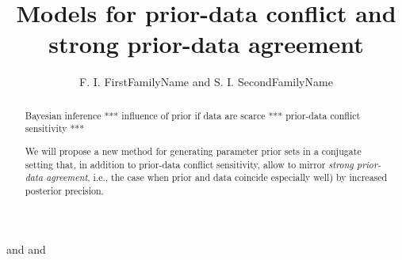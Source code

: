 %
\renewcommand{\thefootnote}{\fnsymbol{footnote}}
\author{F. I. FirstFamilyName and S. I. SecondFamilyName }{
 \footnotemark[1]
and
  \footnotemark[2]
and
  \footnotemark[3]
}


\title{Models for prior-data conflict and strong prior-data agreement}

\maketitle

\renewcommand{\thefootnote}{\arabic{footnote}}

\begin{abstract}
Bayesian inference *** influence of prior if data are scarce *** prior-data conflict sensitivity ***

We will propose a new method for generating parameter prior sets in a conjugate setting
that, in addition to prior-data conflict sensitivity, allow to mirror \emph{strong prior-data agreement},
i.e., the case when prior and data coincide especially well) by increased posterior precision.

\end{abstract}



\def\pdc{prior-data conflict}

\newcommand{\reals}{\mathbb{R}}
\newcommand{\posreals}{\reals_{>0}}
\newcommand{\posrealszero}{\reals_{\ge 0}}
\newcommand{\naturals}{\mathbb{N}}

\newcommand{\dd}{\,\mathrm{d}}

